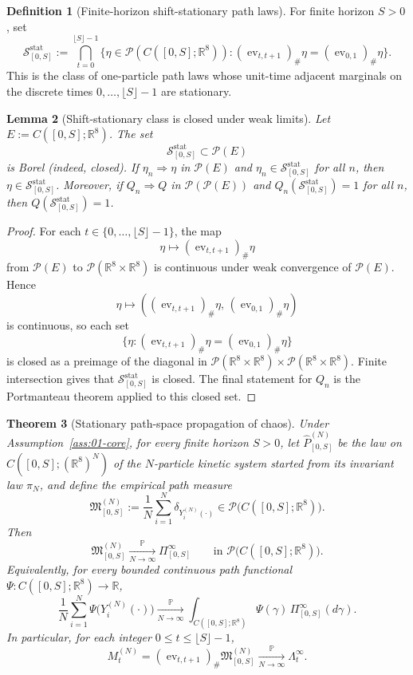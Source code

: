 \documentclass[11pt]{article}
\newtheorem{theorem}{Theorem}[section]
\newtheorem{lemma}[theorem]{Lemma}
\theoremstyle{definition}
\newtheorem{definition}[theorem]{Definition}
\theoremstyle{remark}
\newcommand{\R}{\mathbb R}
\newcommand{\mcP}{\mathcal P}
\begin{document}
\begin{definition}[Finite-horizon shift-stationary path laws]
\label{def:shift-stationary-path-laws}
For finite horizon \(S>0\), set
\[
\mathcal S^{\mathrm{stat}}_{[0,S]}
:=
\bigcap_{t=0}^{\lfloor S\rfloor-1}
\bigl\{
\eta\in\mcP(C([0,S];\R^8)):
(\operatorname{ev}_{t,t+1})_\#\eta
=
(\operatorname{ev}_{0,1})_\#\eta
\bigr\}.
\]
This is the class of one-particle path laws whose unit-time adjacent marginals on
the discrete times \(0,\dots,\lfloor S\rfloor-1\) are stationary.
\end{definition}

\begin{lemma}[Shift-stationary class is closed under weak limits]
\label{lem:shift-stationary-closed}
Let \(E:=C([0,S];\R^8)\). The set
\[
\mathcal S^{\mathrm{stat}}_{[0,S]}\subset\mcP(E)
\]
is Borel (indeed, closed). If \(\eta_n\Rightarrow\eta\) in \(\mcP(E)\) and
\(\eta_n\in\mathcal S^{\mathrm{stat}}_{[0,S]}\) for all \(n\), then
\(\eta\in\mathcal S^{\mathrm{stat}}_{[0,S]}\).
Moreover, if \(Q_n\Rightarrow Q\) in \(\mcP(\mcP(E))\) and
\(Q_n(\mathcal S^{\mathrm{stat}}_{[0,S]})=1\) for all \(n\), then
\(Q(\mathcal S^{\mathrm{stat}}_{[0,S]})=1\).
\end{lemma}

\begin{proof}
For each \(t\in\{0,\dots,\lfloor S\rfloor-1\}\), the map
\[
\eta\mapsto(\operatorname{ev}_{t,t+1})_\#\eta
\]
from \(\mcP(E)\) to \(\mcP(\R^8\times\R^8)\) is continuous under weak
convergence of \(\mcP(E)\). Hence
\[
\eta\mapsto\left(
(\operatorname{ev}_{t,t+1})_\#\eta,\,
(\operatorname{ev}_{0,1})_\#\eta
\right)
\]
is continuous, so each set
\[
\{\eta:(\operatorname{ev}_{t,t+1})_\#\eta=(\operatorname{ev}_{0,1})_\#\eta\}
\]
is closed as a preimage of the diagonal in
\(\mcP(\R^8\times\R^8)\times\mcP(\R^8\times\R^8)\). Finite intersection
gives that \(\mathcal S^{\mathrm{stat}}_{[0,S]}\) is closed. The final
statement for \(Q_n\) is the Portmanteau theorem applied to this closed set.
\end{proof}

\begin{theorem}[Stationary path-space propagation of chaos]
\label{thm:stationary-path-poc}
Under Assumption~\ref{ass:01-core}, for every finite horizon \(S>0\), let
\(\widehat P_{[0,S]}^{(N)}\) be the law on
\(C([0,S];(\R^8)^N)\) of the \(N\)-particle kinetic system started from its
invariant law \(\pi_N\), and define the empirical path measure
\[
\mathfrak M_{[0,S]}^{(N)}
:=
\frac1N\sum_{i=1}^N \delta_{Y_i^{(N)}(\cdot)}
\in\mcP\bigl(C([0,S];\R^8)\bigr).
\]
Then
\[
\mathfrak M_{[0,S]}^{(N)}
\xrightarrow[N\to\infty]{\mathbb P}
\Pi_{[0,S]}^\infty
\qquad
\text{in }\mcP\bigl(C([0,S];\R^8)\bigr).
\]
Equivalently, for every bounded continuous path functional
\(\Psi:C([0,S];\R^8)\to\R\),
\[
\frac1N\sum_{i=1}^N \Psi\!\bigl(Y_i^{(N)}(\cdot)\bigr)
\xrightarrow[N\to\infty]{\mathbb P}
\int_{C([0,S];\R^8)}\Psi(\gamma)\,\Pi_{[0,S]}^\infty(d\gamma).
\]
In particular, for each integer \(0\le t\le\lfloor S\rfloor-1\),
\[
M_t^{(N)}
=(\operatorname{ev}_{t,t+1})_\# \mathfrak M_{[0,S]}^{(N)}
\xrightarrow[N\to\infty]{\mathbb P}
\Lambda_t^\infty.
\]
\end{theorem}
\end{document}
